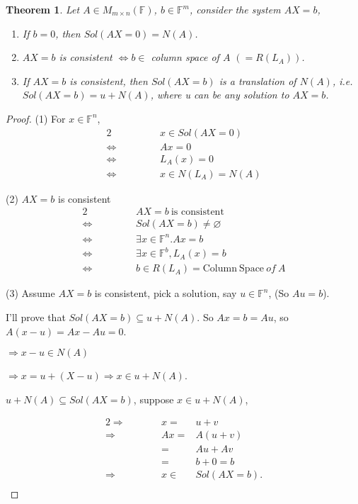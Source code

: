 \documentclass[12pt]{article}
\theoremstyle{plain}
\newtheorem{theorem}{Theorem}[subsection]
\newcommand{\ColSpace}{\mathrm{Column \ Space}}
\newcommand{\mF}{{\mathbb{F}}}
\begin{document}
\begin{theorem}
	Let $A \in M_{m\times n} (\mF)$, $b\in \mF^m$, consider the system $AX=b$,

	\begin{enumerate}
		\item If $b = 0$, then $Sol(AX = 0) = N(A)$.
		\item $AX = b$ is consistent $\Leftrightarrow b \in$ column space of 
			$A$ $(=R(L_A))$. 
		\item If $AX = b$ is consistent, then $Sol(AX=b)$ is a translation
			of $N(A)$, i.e. $Sol(AX=b) = u + N(A)$, where u can be any solution
			to $AX=b$. 
	\end{enumerate}
\end{theorem}
\begin{proof}
	(1) For $x \in \mF^n$,
	\begin{alignat*}{2}
		& & & x \in Sol(AX = 0) \\
		\Leftrightarrow & \qquad & &Ax = 0 \\
		\Leftrightarrow & \qquad & &L_A(x) = 0 \\
		\Leftrightarrow & \qquad & &x \in N(L_A) = N(A)
	\end{alignat*}
	
	(2) $AX = b$ is consistent 
	\begin{alignat*}{2}
		& & &AX = b \ \text{is consistent}	\\
		\Leftrightarrow & \qquad & & Sol(AX = b) \neq \varnothing	\\
		\Leftrightarrow & \qquad & & \exists x \in \mF^n. Ax = b	\\
		\Leftrightarrow & \qquad & & \exists x \in \mF^b, L_A(x) = b	\\
		\Leftrightarrow & \qquad & & b \in R(L_A) = \ColSpace \ of \ A	
	\end{alignat*}
	
	(3) Assume $AX = b$ is consistent, pick a solution, say $u \in \mF^n$, 
	(So $Au = b$). 

	I'll prove that $Sol(AX = b) \subseteq u + N(A)$. 
	So $Ax = b = Au$, so $A(x-u) = Ax - Au = 0$. 

	$\Rightarrow x - u \in N(A)$
	
	$\Rightarrow x = u + (X - u) \Rightarrow x \in u + N(A)$. 

	$u + N(A)\subseteq Sol(AX = b)$, suppose $x \in u + N(A)$, 

	\begin{alignat*}{2}
		\Rightarrow & \qquad & x =& u + v	\\
		\Rightarrow & \qquad & Ax =& A(u+v)	\\
					& &		=& Au + Av	\\
					& &		=& b + 0 = b	\\
		\Rightarrow & \qquad & x \in& Sol(AX=b). \\
	\end{alignat*}
\end{proof}
\end{document}
